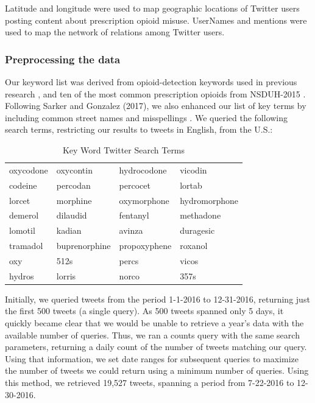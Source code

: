 \documentclass[sigconf]{acmart}
\begin{document}
Latitude and longitude were used to map geographic locations of Twitter users 
posting content about prescription opioid misuse. UserNames and mentions were 
used to map the network of relations among Twitter users. 


\subsubsection{Preprocessing the data} 

Our keyword list was derived from opioid-detection keywords used in previous 
research \cite{chary17, mackey17, lord11}, and ten of the most common 
prescription opioids from NSDUH-2015 \cite{shiverick17}. Following Sarker and 
Gonzalez (2017), we also enhanced our list of key terms by including common 
street names and misspellings \cite{sarker17}. We queried the following search 
terms, restricting our results to tweets in English, from the U.S.:

\begin{table}[htb]
  \centering
  \caption{Key Word Twitter Search Terms}
  \label{my-label}
  \begin{tabular*}{\columnwidth}{llll}
    \toprule
    oxycodone & oxycontin 	& hydrocodone  & vicodin   	\\
    codeine   & percodan  	& percocet 	& lortab    	\\
    lorcet	& morphine  & oxymorphone  & hydromorphone \\
    demerol   & dilaudid  	& fentanyl 	& methadone 	\\
    lomotil   & kadian    	& avinza   	& duragesic 	\\
    tramadol  & buprenorphine & propoxyphene & roxanol  \\
    oxy   	& 512s      	& percs    	& vicos     	\\ 
    hydros	& lorris    	& norco    	& 357s     	    \\
    \bottomrule
  \end{tabular*}
\end{table}

Initially, we queried tweets from the period 1-1-2016 to 12-31-2016, returning 
just the first 500 tweets (a single query). As 500 tweets spanned only 5 days, 
it quickly became clear that we would be unable to retrieve a year’s data with
the available number of queries. Thus, we ran a counts query with the same 
search parameters, returning a daily count of the number of tweets matching 
our query. Using that information, we set date ranges for subsequent queries 
to maximize the number of tweets we could return using a minimum number of 
queries. Using this method, we retrieved 19,527 tweets, spanning a period from 
7-22-2016 to 12-30-2016.
\end{document}
